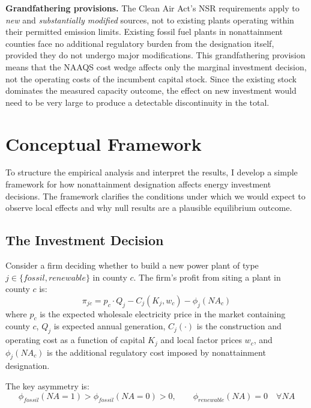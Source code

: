 \documentclass[12pt]{article}
\begin{document}
\textbf{Grandfathering provisions.} The Clean Air Act's NSR requirements apply to \emph{new} and \emph{substantially modified} sources, not to existing plants operating within their permitted emission limits. Existing fossil fuel plants in nonattainment counties face no additional regulatory burden from the designation itself, provided they do not undergo major modifications. This grandfathering provision means that the NAAQS cost wedge affects only the marginal investment decision, not the operating costs of the incumbent capital stock. Since the existing stock dominates the measured capacity outcome, the effect on new investment would need to be very large to produce a detectable discontinuity in the total.


\section{Conceptual Framework}
\label{sec:framework}

To structure the empirical analysis and interpret the results, I develop a simple framework for how nonattainment designation affects energy investment decisions. The framework clarifies the conditions under which we would expect to observe local effects and why null results are a plausible equilibrium outcome.

\subsection{The Investment Decision}

Consider a firm deciding whether to build a new power plant of type $j \in \{fossil, renewable\}$ in county $c$. The firm's profit from siting a plant in county $c$ is:
\begin{equation}
\pi_{jc} = p_c \cdot Q_j - C_j(K_j, w_c) - \phi_j(NA_c)
\label{eq:profit}
\end{equation}
where $p_c$ is the expected wholesale electricity price in the market containing county $c$, $Q_j$ is expected annual generation, $C_j(\cdot)$ is the construction and operating cost as a function of capital $K_j$ and local factor prices $w_c$, and $\phi_j(NA_c)$ is the additional regulatory cost imposed by nonattainment designation.

The key asymmetry is:
\begin{equation}
\phi_{fossil}(NA = 1) > \phi_{fossil}(NA = 0) > 0, \qquad \phi_{renewable}(NA) = 0 \quad \forall NA
\end{equation}
\end{document}
